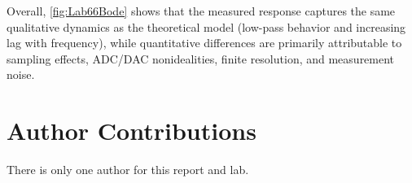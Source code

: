 \documentclass[10pt,twocolumn]{article}
\begin{document}
Overall, \autoref{fig:Lab66Bode} shows that the measured response captures the same qualitative dynamics as the theoretical model (low-pass behavior and increasing lag with frequency), while quantitative differences are primarily attributable to sampling effects, ADC/DAC nonidealities, finite resolution, and measurement noise.

\section{Author Contributions}

There is only one author for this report and lab.







\end{document}
